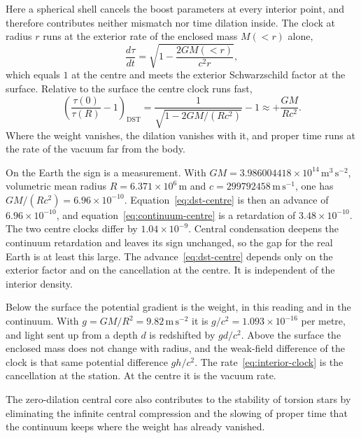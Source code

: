 \documentclass[a4paper]{article}
\begin{document}
Here a spherical shell cancels the boost parameters at every interior point, and therefore contributes neither mismatch nor time dilation inside. The clock at radius \(r\) runs at the exterior rate of the enclosed mass \(M(<r)\) alone,
\begin{equation}
\label{eq:interior-clock}
\frac{d\tau}{dt}
=\sqrt{1-\frac{2GM(<r)}{c^{2}r}},
\end{equation}
which equals \(1\) at the centre and meets the exterior Schwarzschild factor at the surface. Relative to the surface the centre clock runs fast,
\begin{equation}
\label{eq:dst-centre}
\left(\frac{\tau(0)}{\tau(R)}-1\right)_{\mathrm{DST}}
=\frac{1}{\sqrt{1-2GM/(Rc^{2})}}-1
\approx +\frac{GM}{Rc^{2}}.
\end{equation}
Where the weight vanishes, the dilation vanishes with it, and proper time runs at the rate of the vacuum far from the body.

On the Earth the sign is a measurement. With \(GM=3.986004418\times 10^{14}\,\mathrm{m^{3}\,s^{-2}}\), volumetric mean radius \(R=6.371\times 10^{6}\,\mathrm{m}\) and \(c=299792458\,\mathrm{m\,s^{-1}}\), one has \(GM/(Rc^{2})=6.96\times 10^{-10}\). Equation~\eqref{eq:dst-centre} is then an advance of \(6.96\times 10^{-10}\), and equation~\eqref{eq:continuum-centre} is a retardation of \(3.48\times 10^{-10}\). The two centre clocks differ by \(1.04\times 10^{-9}\). Central condensation deepens the continuum retardation and leaves its sign unchanged, so the gap for the real Earth is at least this large. The advance~\eqref{eq:dst-centre} depends only on the exterior factor and on the cancellation at the centre. It is independent of the interior density.

Below the surface the potential gradient is the weight, in this reading and in the continuum. With \(g=GM/R^{2}=9.82\,\mathrm{m\,s^{-2}}\) it is \(g/c^{2}=1.093\times 10^{-16}\) per metre, and light sent up from a depth \(d\) is redshifted by \(gd/c^{2}\). Above the surface the enclosed mass does not change with radius, and the weak-field difference of the clock is that same potential difference \(gh/c^{2}\). The rate~\eqref{eq:interior-clock} is the cancellation at the station. At the centre it is the vacuum rate.

The zero-dilation central core also contributes to the stability of torsion stars by eliminating the infinite central compression and the slowing of proper time that the continuum keeps where the weight has already vanished.
\end{document}
